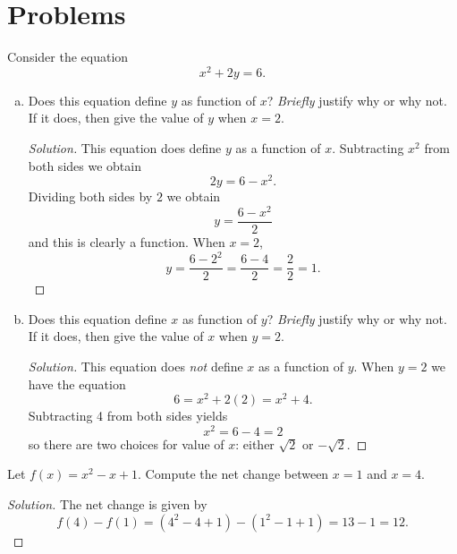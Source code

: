 \documentclass[12pt]{amsart}
\begin{document}
\section{Problems}
\begin{thm}[16 Points]\label{ex7}
  Consider the equation
  $$x^2 + 2y = 6.$$
  \begin{enumerate}[(a)]
  \item
    Does this equation define $y$ as function of $x$?  
    \emph{Briefly} justify why or why not.
    If it does, then give the value of $y$ when $x = 2$.
    \begin{proof}[Solution]
      This equation does define $y$ as a function of $x$.
      Subtracting $x^2$ from both sides we obtain
      $$2y = 6 - x^2.$$
      Dividing both sides by $2$ we obtain
      $$y = \frac{6 - x^2}{2}$$
      and this is clearly a function.
      When $x = 2$,
      $$y = \frac{6 - 2^2}{2} = \frac{6 - 4}{2} = \frac{2}{2} = 1.$$
    \end{proof}
  \item
    Does this equation define $x$ as function of $y$?  \emph{Briefly} justify why or why not.
    If it does, then give the value of $x$ when $y = 2$.
    \begin{proof}[Solution]
      This equation does \emph{not} define $x$ as a function of $y$.
      When $y = 2$ we have the equation
      $$6 = x^2 + 2(2) = x^2 + 4.$$
      Subtracting 4 from both sides yields
      $$x^2 = 6 - 4 = 2$$
      so there are two choices for value of $x$: either $\sqrt{2}$ or $-\sqrt{2}$.
    \end{proof}
  \end{enumerate}
\end{thm}

\begin{thm}[16 Points]\label{ex8}
  Let $f(x) = x^2 -x + 1$.  Compute the net change between $x = 1$ and $x = 4$.
  \begin{proof}[Solution]
    The net change is given by
    $$f(4) - f(1) = (4^2 - 4 + 1) - (1^2 - 1 + 1) = 13 - 1 = 12.$$
  \end{proof}
\end{thm}

\newpage
\end{document}
